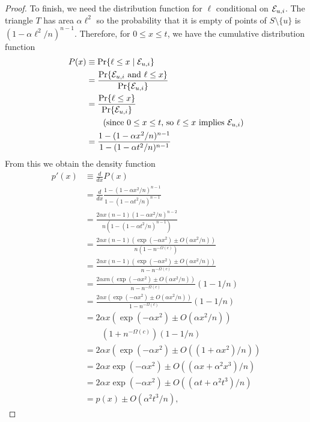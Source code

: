 \documentclass[twoside,leqno,twocolumn]{article}
\begin{document}
\begin{proof}
To finish, we need the distribution function for $\ell$ conditional on
$\mathcal{E}_{u,i}$.  The triangle $T$ has area $\alpha\ell^2$ so the probability that
it is empty of points of $S\setminus\{u\}$ is $(1-\alpha\ell^2/n)^{n-1}$.
Therefore, for $0\le x\le t$, we have the cumulative distribution function
\begin{align*}
   P(x) & \equiv \Pr\{\ell \le x\mid \mathcal{E}_{u,i}\}  \\
      & = \frac{\Pr\{\mathcal{E}_{u,i}\mbox{ and }\ell\le x\}}
               {\Pr\{\mathcal{E}_{u,i}\}} \\
      & = \frac{\Pr\{\ell\le x\}}  
               {\Pr\{\mathcal{E}_{u,i}\}} \\ & \qquad \text{(since $0\le x\le t$, so $\ell \le x$ implies $\mathcal{E}_{u,i}$)} \\
      & = \frac{1-(1-\alpha x^2/n)^{n-1}}{1-(1-\alpha t^2/n)^{n-1}} 
\end{align*}
From this we obtain the density function
\begin{align*}
  p'(x) & \equiv \frac{d}{dx}P(x) \\
        & = \frac{d}{dx}
             \frac{1-(1-\alpha x^2/n)^{n-1}}{1-(1-\alpha t^2/n)^{n-1}} \\
        & = \frac{2\alpha x(n-1)(1-\alpha x^2/n)^{n-2}}
                  {n(1-(1-\alpha t^2/n)^{n-1})} \\
        & = \frac{2\alpha x(n-1)(\exp(-\alpha x^2)\pm O(\alpha x^2/n))}
                  {n(1-n^{-\Omega(c)})} \\
        & = \frac{2\alpha x(n-1)(\exp(-\alpha x^2)\pm O(\alpha x^2/n))}
                  {n-n^{-\Omega(c)}} \\
        & = \frac{2\alpha xn(\exp(-\alpha x^2)\pm O(\alpha x^2/n))}
                  {n-n^{-\Omega(c)}}(1-1/n) \\
        & = \frac{2\alpha x(\exp(-\alpha x^2)\pm O(\alpha x^2/n))}
                  {1-n^{-\Omega(c)}}(1-1/n) \\
        & = 2\alpha x\left(\exp(-\alpha x^2)\pm O(\alpha x^2/n)\right)\\
        &\qquad          (1+n^{-\Omega(c)})(1-1/n) \\
        & = 2\alpha x\left(\exp(-\alpha x^2)\pm O((1+\alpha x^2)/n)\right) \\
        & = 2\alpha x\exp(-\alpha x^2)\pm O((\alpha x+\alpha^2 x^3)/n) \\
        & = 2\alpha x\exp(-\alpha x^2)\pm O((\alpha t + \alpha^2 t^3)/n) \\
        & = p(x)\pm O(\alpha^2 t^3/n) ,
\end{align*}

\end{proof}
\end{document}
